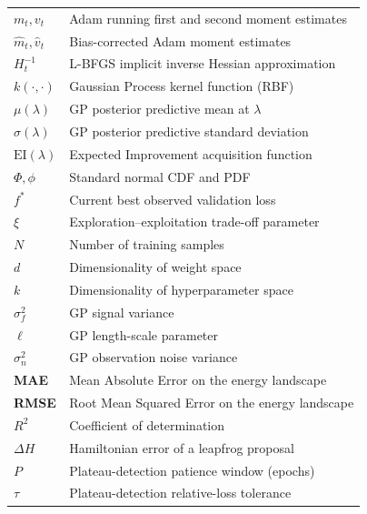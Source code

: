 \documentclass[12pt,a4paper]{article}
\begin{document}
\begin{table}[tb]
\begin{tabular}{>{\bfseries}p{1.45cm} p{6.0cm}}
$m_t, v_t$       & Adam running first and second moment estimates \\
$\hat{m}_t,\hat{v}_t$ & Bias-corrected Adam moment estimates \\
$H_t^{-1}$      & L-BFGS implicit inverse Hessian approximation \\
$k(\cdot,\cdot)$ & Gaussian Process kernel function (RBF) \\
$\mu(\lambda)$   & GP posterior predictive mean at $\lambda$ \\
$\sigma(\lambda)$& GP posterior predictive standard deviation \\
$\mathrm{EI}(\lambda)$ & Expected Improvement acquisition function \\
$\Phi,\phi$      & Standard normal CDF and PDF \\
$f^*$            & Current best observed validation loss \\
$\xi$            & Exploration–exploitation trade-off parameter \\
$N$              & Number of training samples \\
$d$              & Dimensionality of weight space \\
$k$              & Dimensionality of hyperparameter space \\
$\sigma_f^2$     & GP signal variance \\
$\ell$           & GP length-scale parameter \\
$\sigma_n^2$     & GP observation noise variance \\
MAE              & Mean Absolute Error on the energy landscape \\
RMSE             & Root Mean Squared Error on the energy landscape \\
$R^2$            & Coefficient of determination \\
$\Delta H$       & Hamiltonian error of a leapfrog proposal \\
$P$              & Plateau-detection patience window (epochs) \\
$\tau$           & Plateau-detection relative-loss tolerance \\
\bottomrule
\end{tabular}
\end{table}

\newpage

\end{document}
